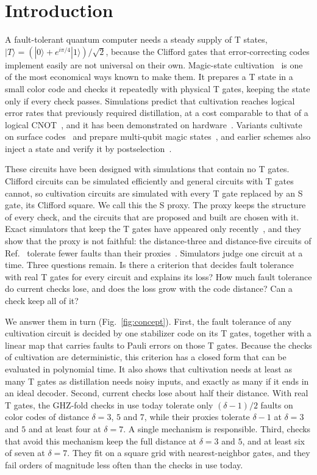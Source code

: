 \documentclass[aps,prl,reprint,twocolumn,amsmath,amssymb,floatfix,nofootinbib,superscriptaddress]{revtex4-2}
\theoremstyle{definition}
\theoremstyle{remark}
\begin{document}
%
\section{Introduction}
A fault-tolerant quantum computer needs a steady supply of T states, $|T\rangle=(|0\rangle+e^{i\pi/4}|1\rangle)/\sqrt2$, because the Clifford gates that error-correcting codes implement easily are not universal on their own. Magic-state cultivation~\cite{cultivation} is one of the most economical ways known to make them. It prepares a T state in a small color code and checks it repeatedly with physical T gates, keeping the state only if every check passes. Simulations predict that cultivation reaches logical error rates that previously required distillation, at a cost comparable to that of a logical CNOT~\cite{cultivation}, and it has been demonstrated on hardware~\cite{googlecultivation}. Variants cultivate on surface codes~\cite{chenrp2,sahay} and prepare multi-qubit magic states~\cite{mincs,minmulti}, and earlier schemes also inject a state and verify it by postselection~\cite{li2015,chamberlandcross,chamberlandnoh,itogawa}.

These circuits have been designed with simulations that contain no T gates. Clifford circuits can be simulated efficiently and general circuits with T gates cannot, so cultivation circuits are simulated with every T gate replaced by an S gate, its Clifford square. We call this the S proxy. The proxy keeps the structure of every check, and the circuits that are proposed and built are chosen with it. Exact simulators that keep the T gates have appeared only recently~\cite{soft,takada,merlin,magna,wanzapirain}, and they show that the proxy is not faithful: the distance-three and distance-five circuits of Ref.~\cite{cultivation} tolerate fewer faults than their proxies~\cite{chan,wanzapirain}. Simulators judge one circuit at a time. Three questions remain. Is there a criterion that decides fault tolerance with real T gates for every circuit and explains its loss? How much fault tolerance do current checks lose, and does the loss grow with the code distance? Can a check keep all of it?

We answer them in turn (Fig.~\ref{fig:concept}). First, the fault tolerance of any cultivation circuit is decided by one stabilizer code on its T gates, together with a linear map that carries faults to Pauli errors on those T gates. Because the checks of cultivation are deterministic, this criterion has a closed form that can be evaluated in polynomial time. It also shows that cultivation needs at least as many T gates as distillation needs noisy inputs, and exactly as many if it ends in an ideal decoder. Second, current checks lose about half their distance. With real T gates, the GHZ-fold checks in use today tolerate only $(\delta-1)/2$ faults on color codes of distance $\delta=3$, $5$ and $7$, while their proxies tolerate $\delta-1$ at $\delta=3$ and $5$ and at least four at $\delta=7$. A single mechanism is responsible. Third, checks that avoid this mechanism keep the full distance at $\delta=3$ and $5$, and at least six of seven at $\delta=7$. They fit on a square grid with nearest-neighbor gates, and they fail orders of magnitude less often than the checks in use today.
\end{document}
